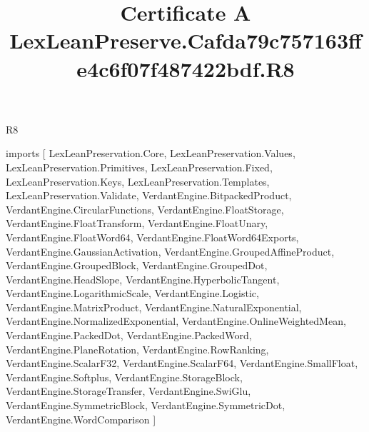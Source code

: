 \begin{lexlean}{R8}
\title{Certificate A LexLeanPreserve.Cafda79c757163ffe4c6f07f487422bdf.R8}
\begin{coremodule}
imports [
  LexLeanPreservation.Core,
  LexLeanPreservation.Values,
  LexLeanPreservation.Primitives,
  LexLeanPreservation.Fixed,
  LexLeanPreservation.Keys,
  LexLeanPreservation.Templates,
  LexLeanPreservation.Validate,
  VerdantEngine.BitpackedProduct,
  VerdantEngine.CircularFunctions,
  VerdantEngine.FloatStorage,
  VerdantEngine.FloatTransform,
  VerdantEngine.FloatUnary,
  VerdantEngine.FloatWord64,
  VerdantEngine.FloatWord64Exports,
  VerdantEngine.GaussianActivation,
  VerdantEngine.GroupedAffineProduct,
  VerdantEngine.GroupedBlock,
  VerdantEngine.GroupedDot,
  VerdantEngine.HeadSlope,
  VerdantEngine.HyperbolicTangent,
  VerdantEngine.LogarithmicScale,
  VerdantEngine.Logistic,
  VerdantEngine.MatrixProduct,
  VerdantEngine.NaturalExponential,
  VerdantEngine.NormalizedExponential,
  VerdantEngine.OnlineWeightedMean,
  VerdantEngine.PackedDot,
  VerdantEngine.PackedWord,
  VerdantEngine.PlaneRotation,
  VerdantEngine.RowRanking,
  VerdantEngine.ScalarF32,
  VerdantEngine.ScalarF64,
  VerdantEngine.SmallFloat,
  VerdantEngine.Softplus,
  VerdantEngine.StorageBlock,
  VerdantEngine.StorageTransfer,
  VerdantEngine.SwiGlu,
  VerdantEngine.SymmetricBlock,
  VerdantEngine.SymmetricDot,
  VerdantEngine.WordComparison
]


\end{coremodule}
\end{lexlean}
